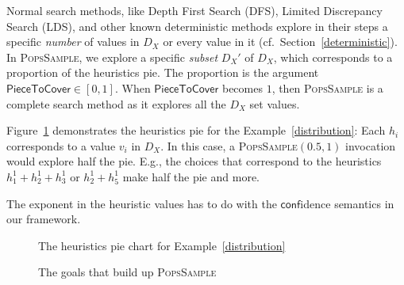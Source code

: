 \documentclass{ws-ijait}
\begin{document}
Normal search methods, like Depth First Search (DFS),
Limited Discrepancy Search (LDS), and other known
deterministic methods explore in their steps a specific
\emph{number} of values in $D_X$ or every value in it (cf.\ 
Section~\ref{deterministic}). In \textsc{PopsSample}, we
explore a specific \emph{subset} $D_X'$ of $D_X$, which
corresponds to a proportion of the heuristics pie. The
proportion is the argument $\mathsf{PieceToCover} \in
[0,1]$. When $\mathsf{PieceToCover}$ becomes $1$, then
\textsc{PopsSample} is a complete search method as it
explores all the $D_X$ set values.
\begin{example}
  Figure~\ref{piechart} demonstrates the heuristics pie for
  the Example~\ref{distribution}: Each $h_i$ corresponds to
  a value $v_i$ in $D_X$. In this case, a
  \textsc{PopsSample}$(0.5,1)$ invocation would explore half
  the pie. E.g., the choices that correspond to the
  heuristics $h_1^1 + h_2^1 + h_3^1$ or $h_2^1 + h_5^1$ make
  half the pie and more.
\end{example}
The exponent in the heuristic values has to do with the
$\mathsf{conf}$idence semantics in our framework.

\begin{figure}
  \centering
  
  \caption{The heuristics pie chart for
           Example~\ref{distribution}\label{piechart}}
\end{figure}

\begin{figure}
  \centering
  \caption{The goals that build up
           \textsc{PopsSample}\label{PopsSampleGoals}}
\end{figure}
\end{document}
